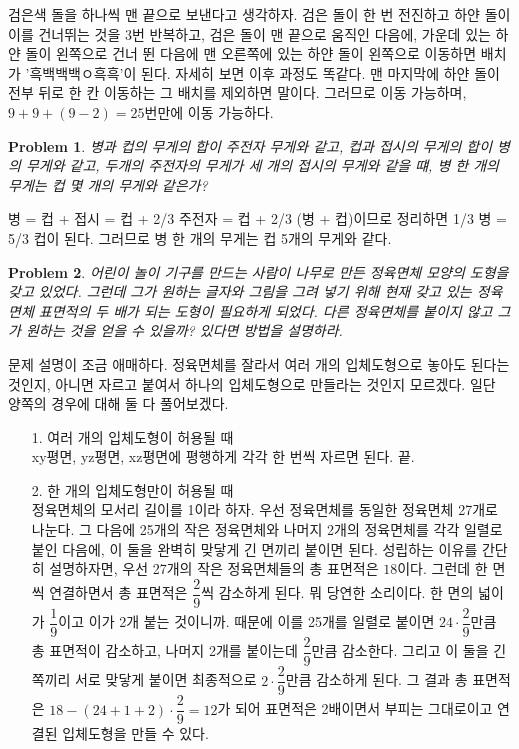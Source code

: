 \documentclass[a4paper,10pt]{article}
\newtheorem{prob}{Problem}
\begin{document}
검은색 돌을 하나씩 맨 끝으로 보낸다고 생각하자. 검은 돌이 한 번 전진하고 하얀 돌이 이를 건너뛰는 것을 3번 반복하고, 검은 돌이 맨 끝으로 움직인 다음에, 가운데 있는 하얀 돌이 왼쪽으로 건너 뛴 다음에 맨 오른쪽에 있는 하얀 돌이 왼쪽으로 이동하면 배치가 '흑백백백ㅇ흑흑'이 된다. 자세히 보면 이후 과정도 똑같다. 맨 마지막에 하얀 돌이 전부 뒤로 한 칸 이동하는 그 배치를 제외하면 말이다. 
그러므로 이동 가능하며, $ 9+9+(9-2)=25 $번만에 이동 가능하다.
\begin{prob}
	병과 컵의 무게의 합이 주전자 무게와 같고, 컵과 접시의 무게의 합이 병의 무게와 같고, 두개의 주전자의 무게가 세 개의 접시의 무게와 같을 떄, 병 한 개의 무게는 컵 몇 개의 무게와 같은가?
\end{prob}
병 = 컵 + 접시 = 컵 + 2/3 주전자 = 컵 + 2/3 (병 + 컵)이므로 정리하면
1/3 병 = 5/3 컵이 된다. 그러므로 병 한 개의 무게는 컵 5개의 무게와 같다.
\begin{prob}
	어린이 놀이 기구를 만드는 사람이 나무로 만든 정육면체 모양의 도형을 갖고 있었다. 그런데 그가 원하는 글자와 그림을 그려 넣기 위해 현재 갖고 있는 정육면체 표면적의 두 배가 되는 도형이 필요하게 되었다. 다른 정육면체를 붙이지 않고 그가 원하는 것을 얻을 수 있을까? 있다면 방법을 설명하라.
\end{prob}
문제 설명이 조금 애매하다. 정육면체를 잘라서 여러 개의 입체도형으로 놓아도 된다는 것인지, 아니면 자르고 붙여서 하나의 입체도형으로 만들라는 것인지 모르겠다. 일단 양쪽의 경우에 대해 둘 다 풀어보겠다.
\begin{enumerate}
	\item[1.]여러 개의 입체도형이 허용될 때\\
	xy평면, yz평면, xz평면에 평행하게 각각 한 번씩 자르면 된다. 끝.
	\item[2.]한 개의 입체도형만이 허용될 때\\
	정육면체의 모서리 길이를 1이라 하자. 우선 정육면체를 동일한 정육면체 27개로 나눈다. 그 다음에 25개의 작은 정육면체와 나머지 2개의 정육면체를 각각 일렬로 붙인 다음에, 이 둘을 완벽히 맞닿게 긴 면끼리 붙이면 된다.
	성립하는 이유를 간단히 설명하자면, 우선 27개의 작은 정육면체들의 총 표면적은 $18$이다. 그런데 한 면씩 연결하면서 총 표면적은 $\dfrac{2}{9}$씩 감소하게 된다. 뭐 당연한 소리이다. 한 면의 넓이가 $\dfrac{1}{9}$이고 이가 2개 붙는 것이니까. 때문에 이를 25개를 일렬로 붙이면 $24\cdot\dfrac{2}{9}$만큼 총 표면적이 감소하고, 나머지 2개를 붙이는데 $\dfrac{2}{9}$만큼 감소한다. 그리고 이 둘을 긴 쪽끼리 서로 맞닿게 붙이면 최종적으로 $2\cdot\dfrac{2}{9}$만큼 감소하게 된다. 그 결과 총 표면적은 $18-(24+1+2)\cdot\dfrac{2}{9}=12$가 되어 표면적은 2배이면서 부피는 그대로이고 연결된 입체도형을 만들 수 있다.
\end{enumerate}
\end{document}

